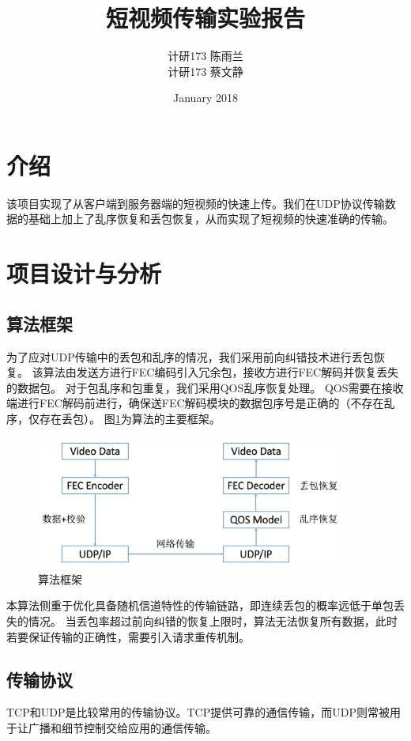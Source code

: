 \documentclass[onecolumn]{article}
\title{短视频传输实验报告}
\author{计研173 \quad 陈雨兰 \quad 2017310787  \\ 计研173 \quad 蔡文静 \quad 2017210866}
\date{January 2018}
\begin{document}
	\begin{CJK*}{UTF8}{gbsn}
		
		\maketitle
		\section{介绍}
		该项目实现了从客户端到服务器端的短视频的快速上传。我们在UDP协议传输数据的基础上加上了乱序恢复和丢包恢复，从而实现了短视频的快速准确的传输。
		
		\section{项目设计与分析}
		\subsection{算法框架}
		为了应对UDP传输中的丢包和乱序的情况，我们采用前向纠错技术进行丢包恢复。
		该算法由发送方进行FEC编码引入冗余包，接收方进行FEC解码并恢复丢失的数据包。
		对于包乱序和包重复，我们采用QOS乱序恢复处理。
		QOS需要在接收端进行FEC解码前进行，确保送FEC解码模块的数据包序号是正确的（不存在乱序，仅存在丢包）。
		图\ref{fig:frame}为算法的主要框架。
		
		\begin{figure}[h]
			\centering
			\includegraphics[width=4in]{frame.jpg}
			\caption{算法框架}
			\label{fig:frame}
		\end{figure}
		
		本算法侧重于优化具备随机信道特性的传输链路，即连续丢包的概率远低于单包丢失的情况。
		当丢包率超过前向纠错的恢复上限时，算法无法恢复所有数据，此时若要保证传输的正确性，需要引入请求重传机制。
		
		\subsection{传输协议}
		TCP和UDP是比较常用的传输协议。TCP提供可靠的通信传输，而UDP则常被用于让广播和细节控制交给应用的通信传输。

\end{CJK*}
\end{document}
